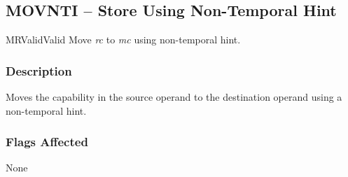 \clearpage
{}
{}
\subsection*{MOVNTI -- Store Using Non-Temporal Hint}

\begin{x86opcodetable}
  {MR}{Valid}{Valid}
  {Move \emph{rc} to \emph{mc} using non-temporal hint.}
\end{x86opcodetable}

\begin{x86opentable}
\end{x86opentable}

\subsubsection*{Description}

Moves the capability in the source operand to the destination operand
using a non-temporal hint.

\subsubsection*{Flags Affected}

None
